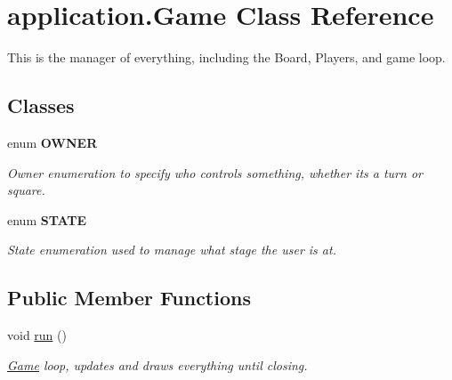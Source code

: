 \hypertarget{classapplication_1_1_game}{\section{application.\+Game Class Reference}
\label{classapplication_1_1_game}
}


This is the manager of everything, including the Board, Players, and game loop.  


\subsection*{Classes}
\begin{DoxyCompactItemize}
\item 
enum {\bfseries O\+W\+N\+E\+R}
\begin{DoxyCompactList}\small\item\em Owner enumeration to specify who controls something, whether its a turn or square. \end{DoxyCompactList}\item 
enum {\bfseries S\+T\+A\+T\+E}
\begin{DoxyCompactList}\small\item\em State enumeration used to manage what stage the user is at. \end{DoxyCompactList}\end{DoxyCompactItemize}
\subsection*{Public Member Functions}
\begin{DoxyCompactItemize}
\item 
\hypertarget{classapplication_1_1_game_a35f63ec92d69c27a46171e54477a4783}{void \hyperlink{classapplication_1_1_game_a35f63ec92d69c27a46171e54477a4783}{run} ()}\label{classapplication_1_1_game_a35f63ec92d69c27a46171e54477a4783}

\begin{DoxyCompactList}\small\item\em \hyperlink{classapplication_1_1_game}{Game} loop, updates and draws everything until closing. \end{DoxyCompactList}\end{DoxyCompactItemize}
